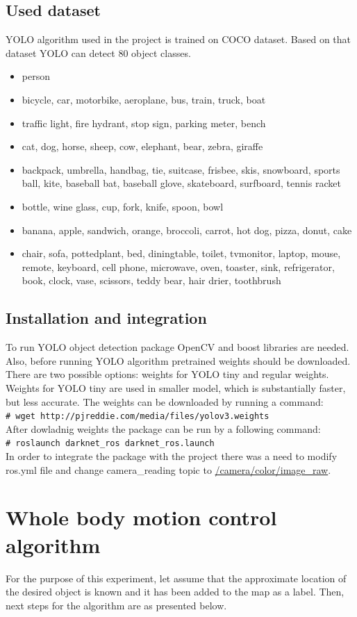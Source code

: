 \documentclass[conference,a4paper]{IEEEtran}
\newcommand{\shellcmd}[1]{\\\texttt{\footnotesize\# #1}\\}
\begin{document}
\subsection{Used dataset}
YOLO algorithm used in the project is trained on COCO dataset. Based on that dataset YOLO can detect 80 object classes.
\begin{itemize}
\item person
\item bicycle, car, motorbike, aeroplane, bus, train, truck, boat
\item traffic light, fire hydrant, stop sign, parking meter, bench
\item cat, dog, horse, sheep, cow, elephant, bear, zebra, giraffe
\item backpack, umbrella, handbag, tie, suitcase, frisbee, skis, snowboard, sports ball, kite, baseball bat, baseball glove, skateboard, surfboard, tennis racket
\item bottle, wine glass, cup, fork, knife, spoon, bowl
\item banana, apple, sandwich, orange, broccoli, carrot, hot dog, pizza, donut, cake
\item chair, sofa, pottedplant, bed, diningtable, toilet, tvmonitor, laptop, mouse, remote, keyboard, cell phone, microwave, oven, toaster, sink, refrigerator, book, clock, vase, scissors, teddy bear, hair drier, toothbrush
\end{itemize}

\subsection{Installation and integration}
To run YOLO object detection package OpenCV and boost libraries are needed. Also, before running YOLO algorithm pretrained weights should be downloaded. There are two possible options: weights for YOLO tiny and regular weights. Weights for YOLO tiny are used in smaller model, which is substantially faster, but less accurate. The weights can be downloaded by running a command:
\shellcmd{wget http://pjreddie.com/media/files/yolov3.weights}
After dowladnig weights the package can be run by a following command:
\shellcmd{roslaunch darknet\_ros darknet\_ros.launch}
In order to integrate the package with the project there was a need to modify ros.yml file and change camera\_reading topic to \url{/camera/color/image_raw}.


\section{Whole body motion control algorithm}
For the purpose of this experiment, let assume that the approximate location of the desired object is known and it has been added to the map as a label. Then, next steps for the algorithm are as presented below.
\end{document}
